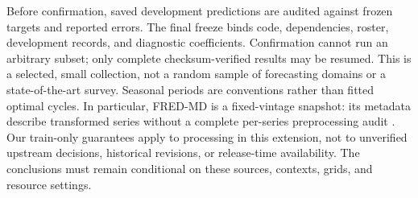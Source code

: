 Before confirmation, saved development predictions are audited against frozen
targets and reported errors.  The final freeze binds code, dependencies,
roster, development records, and diagnostic coefficients.  Confirmation cannot
run an arbitrary subset; only complete checksum-verified results may be resumed.
This is a selected, small collection, not a random sample of forecasting
domains or a state-of-the-art survey.  Seasonal periods are conventions rather
than fitted optimal cycles.  In particular, FRED-MD is a fixed-vintage
snapshot: its metadata describe transformed series without a complete
per-series preprocessing audit \citep{DatasetFREDMD}.  Our train-only guarantees
apply to processing in this extension, not to unverified upstream decisions,
historical revisions, or release-time availability.  The conclusions must
remain conditional on these sources, contexts, grids, and resource settings.
